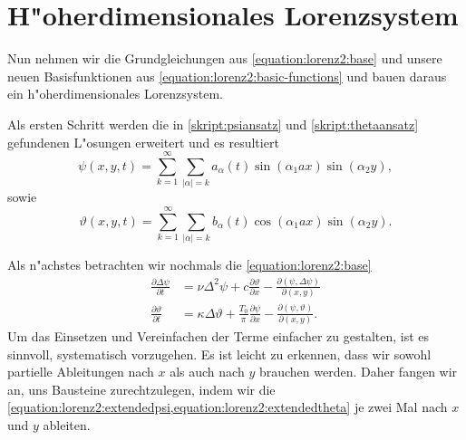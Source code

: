 \section{H"oherdimensionales Lorenzsystem\label{section:lorenz2:ho-model}}
Nun nehmen wir die Grundgleichungen aus \cref{equation:lorenz2:base} und unsere 
neuen Basisfunktionen aus \cref{equation:lorenz2:basic-functions} und bauen 
daraus ein h"oherdimensionales Lorenzsystem.

Als ersten Schritt werden die in \cref{skript:psiansatz} und 
\cref{skript:thetaansatz} gefundenen L"osungen erweitert und es resultiert
\begin{equation}
\psi(x,y,t) =
\sum_{k = 1}^{\infty}
\sum_{|\alpha| = k}
a_{\alpha}(t)
\sin(\alpha_1 ax) \sin(\alpha_2 y),
\label{equation:lorenz2:extendedpsi}
\end{equation}
sowie
\begin{equation}
\vartheta(x,y,t) =
\sum_{k = 1}^{\infty}
\sum_{|\alpha| = k}
b_{\alpha}(t)
\cos(\alpha_1 ax) \sin(\alpha_2 y).
\label{equation:lorenz2:extendedtheta}
\end{equation}

Als n"achstes betrachten wir nochmals die \cref{equation:lorenz2:base}
\begin{align*}
\frac{\partial\Delta\psi}{\partial t}
&=
\nu\Delta^2\psi 
+c\frac{\partial\vartheta}{\partial x}
-\frac{\partial(\psi,\Delta\psi)}{\partial(x,y)}
\\
\frac{\partial\vartheta}{\partial t}
&=
\kappa\Delta\vartheta
+ \frac{T_0}{\pi}\frac{\partial\psi}{\partial x}
- \frac{\partial(\psi,\vartheta)}{\partial(x,y)}.
\end{align*}
Um das Einsetzen und Vereinfachen der Terme einfacher zu gestalten, ist es 
sinnvoll, systematisch vorzugehen. Es ist leicht zu erkennen, dass wir sowohl 
partielle Ableitungen nach $x$ als auch nach $y$ brauchen werden. Daher fangen 
wir an, uns Bausteine zurechtzulegen, indem wir die 
\cref{equation:lorenz2:extendedpsi,equation:lorenz2:extendedtheta} 
je zwei Mal nach $x$ und $y$ ableiten.

